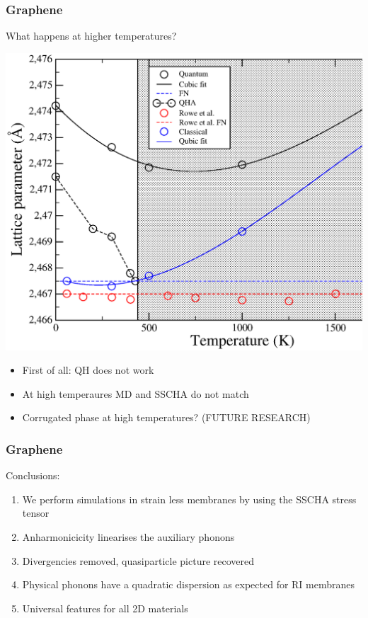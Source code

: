 \documentclass{beamer}
\begin{document}
\begin{frame}

\frametitle{Graphene}
What happens at higher temperatures?
\begin{center}
 \includegraphics[width=0.60\linewidth]{Pictures/Graphene/lattice.eps}
\end{center}
\begin{itemize}
\item First of all: QH does not work
\item At high temperaures MD and SSCHA do not match
\item Corrugated phase at high temperatures? (FUTURE RESEARCH)
\end{itemize}

\end{frame}


\begin{frame}

 \frametitle{Graphene}
Conclusions:
 \begin{enumerate}
  \item We perform simulations in strain less membranes by using the SSCHA stress tensor
  \item Anharmonicicity linearises the auxiliary phonons 
  \item Divergencies removed, quasiparticle picture recovered
  \item Physical phonons have a quadratic dispersion as expected for RI membranes
  \item Universal features for all 2D materials
 \end{enumerate}

\end{frame}

\end{document}
